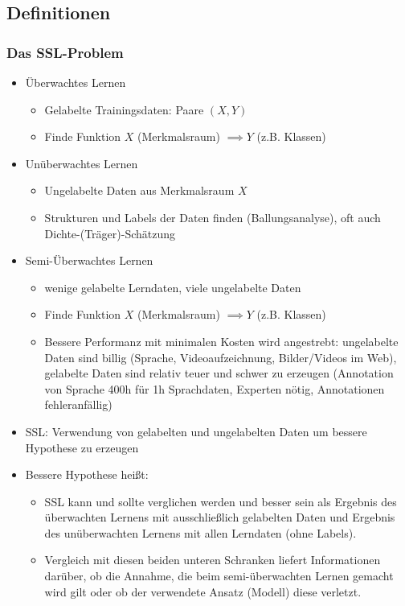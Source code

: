 \documentclass[paper=a4, fontsize=11pt]{scrartcl} %
\numberwithin{equation}{section} %
\numberwithin{figure}{section} %
\numberwithin{table}{section} %
\begin{document}
\subsection{Definitionen}

\subsubsection{Das SSL-Problem}

\begin{itemize}
\item Überwachtes Lernen
\begin{itemize}
\item Gelabelte Trainingsdaten: Paare $(X,Y)$
\item Finde Funktion $X$ (Merkmalsraum) $\implies Y$ (z.B. Klassen)
\end{itemize}
\item Unüberwachtes Lernen
\begin{itemize}
\item Ungelabelte Daten aus Merkmalsraum $X$
\item Strukturen und Labels der Daten finden (Ballungsanalyse), oft auch Dichte-(Träger)-Schätzung
\end{itemize}
\item Semi-Überwachtes Lernen
\begin{itemize}
\item wenige gelabelte Lerndaten, viele ungelabelte Daten
\item Finde Funktion $X$ (Merkmalsraum) $\implies Y$ (z.B. Klassen)
\item Bessere Performanz mit minimalen Kosten wird angestrebt: ungelabelte Daten sind billig (Sprache, Videoaufzeichnung, Bilder/Videos im Web), gelabelte Daten sind relativ teuer und schwer zu erzeugen (Annotation von Sprache 400h für 1h Sprachdaten, Experten nötig, Annotationen fehleranfällig)
\end{itemize}
\item SSL: Verwendung von gelabelten und ungelabelten Daten um bessere Hypothese zu erzeugen
\item Bessere Hypothese heißt:
\begin{itemize}
\item SSL kann und sollte verglichen werden und besser sein als Ergebnis des überwachten Lernens mit ausschließlich gelabelten Daten und Ergebnis des unüberwachten Lernens mit allen Lerndaten (ohne Labels).
\item Vergleich mit diesen beiden unteren Schranken liefert Informationen darüber, ob die Annahme, die beim semi-überwachten Lernen gemacht wird gilt oder ob der verwendete Ansatz (Modell) diese verletzt.
\end{itemize}
\end{itemize}
\newpage
\end{document}
